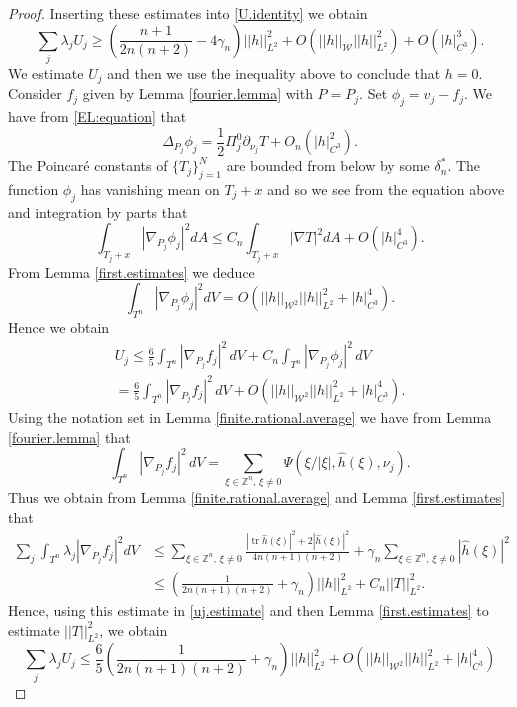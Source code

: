 \documentclass[11pt]{amsart}
\def\Z{\mathbb Z}
\def\tr{\operatorname{tr}}
\theoremstyle{remark}
\theoremstyle{definition}
\begin{document}
\begin{proof}
		Inserting these estimates into \eqref{U.identity} we obtain
		\begin{equation}\label{contradiction.estimate}
			\sum_j\lambda_j U_j\geq  \left(\frac{n+1}{2n(n+2)}-4\gamma_n\right)||h||^2_{L^2}+O(||h||_{\mathcal W}||h||^2_{L^2})+O(|h|_{C^3}^3).
		\end{equation}
		We estimate $U_j$ and then we use the  inequality above to conclude that $h=0$. Consider $f_j$ given by Lemma \ref{fourier.lemma} with $P=P_j$. Set $\phi_j=v_j-f_j$. We have from \eqref{EL:equation} that
		$$\Delta_{P_j}\phi_j=\frac12\Pi_j^0\partial_{\nu_j}T+O_n(|h|^2_{C^3}).
		$$
		The Poincar\'e constants of $\{T_j\}_{j=1}^N$ are bounded from below by some $\delta_n^*$. The function $\phi_j$ has vanishing mean on  $T_j+x$  and so we see from the equation above and integration by parts that
		$$\int_{T_j+x}|\nabla_{P_j}\phi_j|^2dA\leq C_n\int_{T_j+x}|\nabla T|^2dA+O(|h|^4_{C^3}).$$
		From Lemma \ref{first.estimates} we deduce
		\begin{equation}\label{gradient.phi}
			\int_{T^n}|\nabla_{P_j}\phi_j|^2dV=O(||h||_{\mathcal W^2}||h||^2_{L^2}+|h|^4_{C^3}).
		\end{equation}
		Hence we obtain
		\begin{multline}\label{uj.estimate}
			U_j\leq  \frac{6}{5}\int_{T^n}|\nabla_{P_j}f_j|^2\,dV+C_n\int_{T^n}|\nabla_{P_j}\phi_j|^2\,dV\\=\frac{6}{5}\int_{T^n}|\nabla_{P_j}f_j|^2\,dV+O(||h||_{\mathcal W^2}||h||^2_{L^2}+|h|^4_{C^3}).
		\end{multline}
		Using the notation set in Lemma \ref{finite.rational.average} we have from Lemma \ref{fourier.lemma} that
		$$\int_{T^n}|\nabla_{P_j}f_j|^2\,dV=\sum_{\xi \in \Z^n,\, {\xi\neq0}} \Psi(\xi/|\xi|,\widehat h(\xi),\nu_j).$$
		Thus we obtain from Lemma \ref{finite.rational.average} and Lemma \ref{first.estimates} that
		$$
		\begin{aligned}\sum_j\int_{T^n}\lambda_j|\nabla_{P_j}f_j|^2dV&\leq  \sum_{\xi \in \Z^n,\,{\xi\neq0}}\! \frac{|\tr \widehat h(\xi)|^2+2|\widehat h(\xi)|^2}{4n(n+1)(n+2)}\!+\!\gamma_n\sum_{\xi \in \Z^n,\,{\xi\neq0}}\!|\widehat h(\xi)|^2\\
			&\leq \left(\frac{1}{2n(n+1)(n+2)}+\gamma_n\right)||h||^2_{L^2}+C_n||T||^2_{L^2}.
		\end{aligned}
		$$
		Hence, using this estimate in \eqref{uj.estimate} and then Lemma \ref{first.estimates} to estimate  $||T||^2_{L^2}$, we obtain
		$$\sum_j\lambda_j U_j\leq  \frac{6}{5}\left(\frac{1}{2n(n+1)(n+2)}+\gamma_n\right)||h||^2_{L^2}+O(||h||_{\mathcal W^2}||h||^2_{L^2}+|h|^4_{C^3})
$$
\end{proof}
\end{document}
